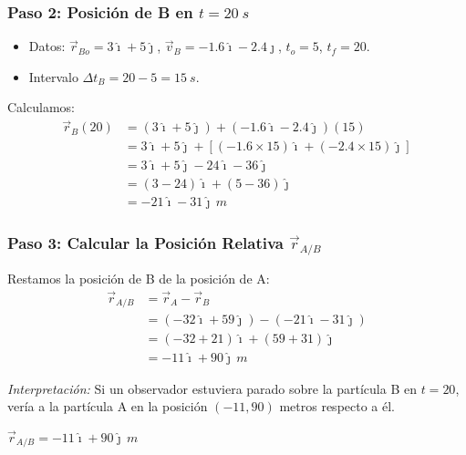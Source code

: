 \documentclass[12pt, a4paper]{article}
\begin{document}
\subsubsection*{Paso 2: Posición de B en $t = \SI{20}{s}$}
\begin{itemize}
    \item Datos: $\vec{r}_{Bo} = 3\hat{\imath} + 5\hat{\jmath}$, $\vec{v}_B = -1.6\hat{\imath} - 2.4\hat{\jmath}$, $t_o = 5$, $t_f = 20$.
    \item Intervalo $\Delta t_B = 20 - 5 = \SI{15}{s}$.
\end{itemize}
Calculamos:
\begin{align*}
    \vec{r}_B(20) &= (3\hat{\imath} + 5\hat{\jmath}) + (-1.6\hat{\imath} - 2.4\hat{\jmath})(15) \\
    &= 3\hat{\imath} + 5\hat{\jmath} + [(-1.6 \times 15)\hat{\imath} + (-2.4 \times 15)\hat{\jmath}] \\
    &= 3\hat{\imath} + 5\hat{\jmath} - 24\hat{\imath} - 36\hat{\jmath} \\
    &= (3 - 24)\hat{\imath} + (5 - 36)\hat{\jmath} \\
    &= -21\hat{\imath} - 31\hat{\jmath} \, \si{m}
\end{align*}

\subsubsection*{Paso 3: Calcular la Posición Relativa $\vec{r}_{A/B}$}
Restamos la posición de B de la posición de A:
\begin{align*}
    \vec{r}_{A/B} &= \vec{r}_A - \vec{r}_B \\
    &= (-32\hat{\imath} + 59\hat{\jmath}) - (-21\hat{\imath} - 31\hat{\jmath}) \\
    &= (-32 + 21)\hat{\imath} + (59 + 31)\hat{\jmath} \\
    &= -11\hat{\imath} + 90\hat{\jmath} \, \si{m}
\end{align*}

\textit{Interpretación:} Si un observador estuviera parado sobre la partícula B en $t=20$, vería a la partícula A en la posición $(-11, 90)$ metros respecto a él.

\begin{tcolorbox}[colback=blue!5!white, colframe=blue!75!black, title=Respuesta Final]
    \centering
    \Large $\vec{r}_{A/B} = -11\hat{\imath} + 90\hat{\jmath} \, \si{m}$
\end{tcolorbox}
\end{document}

